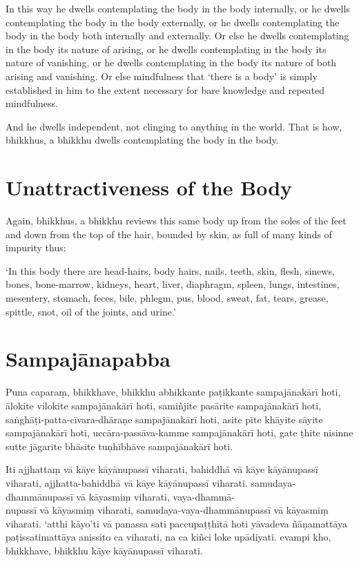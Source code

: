 In this way he dwells contemplating the body in the body internally, or he
dwells contemplating the body in the body externally, or he dwells contemplating
the body in the body both internally and externally. Or else he dwells
contemplating in the body its nature of arising, or he dwells contemplating in
the body its nature of vanishing, or he dwells contemplating in the body its
nature of both arising and vanishing. Or else mindfulness that ‘there is a body’
is simply established in him to the extent necessary for bare knowledge and
repeated mindfulness.

And he dwells independent, not clinging to anything in the world. That is how,
bhikkhus, a bhikkhu dwells contemplating the body in the body.


\section{Unattractiveness of the Body}

Again, bhikkhus, a bhikkhu reviews this same body up from the soles of the feet
and down from the top of the hair, bounded by skin, as full of many kinds of
impurity thus:

\enlargethispage{2\baselineskip}

‘In this body there are head-hairs, body hairs, nails, teeth, skin, flesh,
sinews, bones, bone-marrow, kidneys, heart, liver, diaphragm, spleen, lungs,
intestines, mesentery, stomach, feces, bile, phlegm, pus, blood, sweat, fat,
tears, grease, spittle, snot, oil of the joints, and urine.’

\paliPage
\section*{Sampajānapabba}

Puna caparaṃ, bhikkhave, bhikkhu abhikkante paṭikkante sampajānakārī hoti,
ālokite vilokite sampajānakārī hoti, samiñjite pasārite sampajānakārī hoti,
saṅghāṭi-patta-cīvara-dhāraṇe sampajānakārī hoti, asite pīte khāyite sāyite
sampajānakārī hoti, uccāra-passāva-kamme sampajānakārī hoti, gate ṭhite nisinne
sutte jāgarite bhāsite tuṇhībhāve sampajānakārī hoti.

Iti ajjhattaṃ vā kāye kāyānupassī viharati, bahiddhā vā kāye kāyānupassī
viharati, ajjhatta-bahiddhā vā kāye kāyānupassī viharati. samudaya-dhammānupassī
vā kāyasmiṃ viharati, vaya-dhammā-\\
nupassī vā kāyasmiṃ viharati, samudaya-vaya-dhammānupassī vā kāyasmiṃ viharati.
‘atthi kāyo’ti vā panassa sati paccupaṭṭhitā hoti yāvadeva ñāṇamattāya
paṭissatimattāya anissito ca viharati, na ca kiñci loke upādiyati. evampi kho,
bhikkhave, bhikkhu kāye kāyānupassī viharati.

